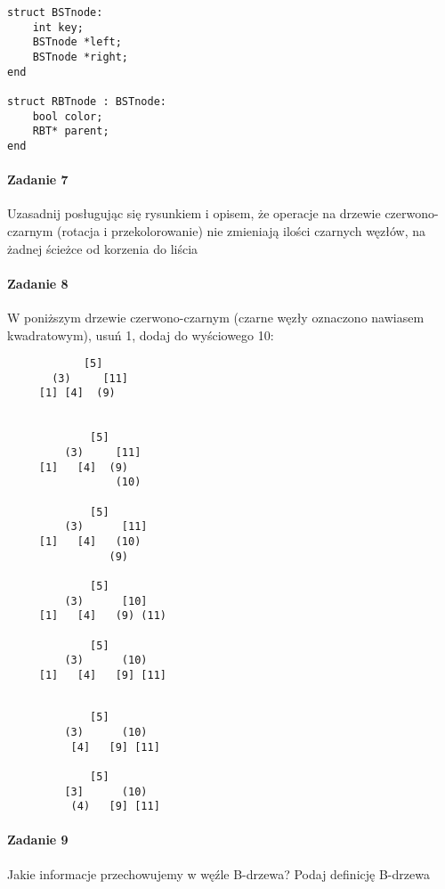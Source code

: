 \documentclass[18pt]{extarticle}
\begin{document}
\begin{lstlisting}
struct BSTnode:
    int key;	 
    BSTnode *left;	 
    BSTnode *right;
end

struct RBTnode : BSTnode:
    bool color;	 
    RBT* parent;
end
\end{lstlisting}

\paragraph{Zadanie 7} Uzasadnij posługując się rysunkiem i opisem, że operacje na drzewie czerwono-czarnym (rotacja i przekolorowanie) nie zmieniają ilości czarnych węzłów, na żadnej ścieżce od korzenia
do liścia

\paragraph{Zadanie 8} W poniższym drzewie czerwono-czarnym (czarne węzły oznaczono nawiasem kwadratowym), usuń 1, dodaj do wyściowego 10:

\begin{multicols}{2}
    \begin{lstlisting}
            [5] 
       (3)     [11] 
     [1] [4]  (9) 
    
    
             [5] 
         (3)     [11] 
     [1]   [4]  (9) 
                 (10) 
     
             [5] 
         (3)      [11] 
     [1]   [4]   (10) 
                (9) 
     
             [5] 
         (3)      [10] 
     [1]   [4]   (9) (11)
     
             [5] 
         (3)      (10) 
     [1]   [4]   [9] [11]
                 
    \end{lstlisting}
    
    \columnbreak
    \begin{lstlisting}
             [5] 
         (3)      (10) 
          [4]   [9] [11]
    
             [5] 
         [3]      (10) 
          (4)   [9] [11]
    \end{lstlisting}
    \end{multicols}

\paragraph{Zadanie 9} Jakie informacje przechowujemy w węźle B-drzewa? Podaj definicję B-drzewa
\end{document}
